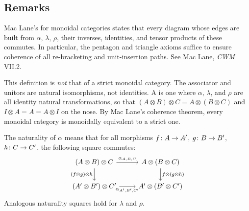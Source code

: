\documentclass[../preamble]{subfiles}
\begin{document}
\subsection{Remarks}

\begin{remark}[Coherence]
  \label{rem:coherence}
  Mac Lane's  for monoidal categories states that
  every diagram whose edges are built from
  $\alpha$, $\lambda$, $\rho$, their inverses,
  identities, and tensor products of these
  commutes.
  In particular,
  the pentagon and triangle axioms suffice to ensure coherence
  of all re-bracketing and unit-insertion paths.
  See Mac Lane, \emph{CWM} VII.2.
\end{remark}

\begin{remark}[Strictness]
  \label{rem:strictness}
  This definition is \emph{not} that of a strict monoidal category.
  The associator and unitors are natural isomorphisms,
  not identities.
  A  is one where
  $\alpha$, $\lambda$, and $\rho$ are all identity natural transformations,
  so that $(A \otimes B) \otimes C = A \otimes (B \otimes C)$
  and $I \otimes A = A = A \otimes I$ on the nose.
  By Mac Lane's coherence theorem,
  every monoidal category is monoidally equivalent to a strict one.
\end{remark}

\begin{remark}
  \label{rem:naturality}
  The naturality of $\alpha$ means that
  for all morphisms
  $f \colon A \lto A'$,
  $g \colon B \lto B'$,
  $h \colon C \lto C'$,
  the following square commutes:
  \begin{equation}
    \label{eq:associator-naturality}
    \begin{tikzcd}
      (A \otimes B) \otimes C
        \arrow[r, "\alpha_{A,B,C}"]
        \arrow[d, "(f \otimes g) \otimes h"']
      & A \otimes (B \otimes C)
        \arrow[d, "f \otimes (g \otimes h)"]
      \\
      (A' \otimes B') \otimes C'
        \arrow[r, "\alpha_{A',B',C'}"']
      & A' \otimes (B' \otimes C')
    \end{tikzcd}
  \end{equation}
  Analogous naturality squares hold for $\lambda$ and $\rho$.
\end{remark}
\end{document}
